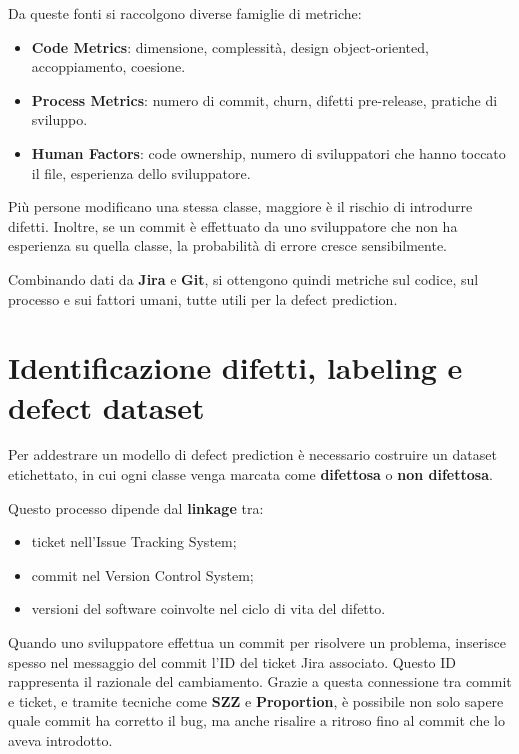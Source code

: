 Da queste fonti si raccolgono diverse famiglie di metriche:
\begin{itemize}
    \item \textbf{Code Metrics}: dimensione, complessità, design object-oriented, accoppiamento, coesione.
    \item \textbf{Process Metrics}: numero di commit, churn, difetti pre-release, pratiche di sviluppo.
    \item \textbf{Human Factors}: code ownership, numero di sviluppatori che hanno toccato il file, esperienza dello sviluppatore.
\end{itemize}

\begin{notaprof}
Più persone modificano una stessa classe, maggiore è il rischio di introdurre difetti. Inoltre, se un commit è effettuato da uno sviluppatore che non ha esperienza su quella classe, la probabilità di errore cresce sensibilmente.
\end{notaprof}

Combinando dati da \textbf{Jira} e \textbf{Git}, si ottengono quindi metriche sul codice, sul processo e sui fattori umani, tutte utili per la defect prediction.

\section{Identificazione difetti, labeling e defect dataset}

Per addestrare un modello di defect prediction è necessario costruire un dataset etichettato, in cui ogni classe venga marcata come \textbf{difettosa} o \textbf{non difettosa}.

Questo processo dipende dal \textbf{linkage} tra:
\begin{itemize}
    \item ticket nell'Issue Tracking System;
    \item commit nel Version Control System;
    \item versioni del software coinvolte nel ciclo di vita del difetto.
\end{itemize}

\begin{notaprof}
Quando uno sviluppatore effettua un commit per risolvere un problema, inserisce spesso nel messaggio del commit l'ID del ticket Jira associato. Questo ID rappresenta il razionale del cambiamento. Grazie a questa connessione tra commit e ticket, e tramite tecniche come \textbf{SZZ} e \textbf{Proportion}, è possibile non solo sapere quale commit ha corretto il bug, ma anche risalire a ritroso fino al commit che lo aveva introdotto.
\end{notaprof}

